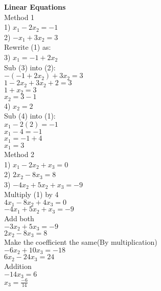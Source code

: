 \documentclass[]{article}
\begin{document}
\textbf{Linear Equations}\\
\textsf{Method 1}\\
1) $x_1 - 2x_2 = -1$\\
2) $-x_1 + 3x_2 = 3$\\
Rewrite (1) as:\\
3) $x_1 = -1 + 2x_2$\\
Sub (3) into (2):\\
$-(-1+2x_2) + 3x_2 = 3$\\
$1 - 2x_2 + 3x_2 +2 = 3$\\
$1 + x_2 = 3$\\
$x_2 = 3 - 1$\\
4) $x_2 = 2$\\
Sub (4) into (1):\\
$x_1 - 2(2) = -1$\\
$x_1 - 4 = -1$\\
$x_1 = -1 + 4$\\
$x_1 = 3$\\
\textsf{Method 2}\\
1) $x_1 - 2x_2 + x_3 = 0$\\
2) $2x_2 - 8x_3 = 8$\\
3) $-4x_2 + 5x_2 + x_3 = -9$\\
Multiply (1) by 4\\
$4x_1 - 8x_2 + 4x_3 = 0$\\
$-4x_1 + 5x_2 + x_3 = -9$\\
Add both\\
$-3x_2 + 5x_3 = -9$\\
$2x_2 - 8x_3 = 8$\\
Make the coefficient the same(By multiplication)\\
$-6x_2 + 10x_3 = -18$\\
$6x_2 - 24x_3 = 24$\\
Addition\\
$-14x_3 = 6$\\
$x_3 = \frac{-6}{14}$\\
\end{document}
